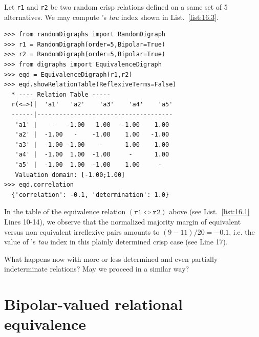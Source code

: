 Let \texttt{r1} and \texttt{r2} be two random crisp relations defined on a same set of 5 alternatives. We may compute \Kendall 's \emph{tau} index shown in List.~\vref{list:16.3}.
\begin{lstlisting}[caption={Computing a relational equivalence digraph},label=list:16.3]
>>> from randomDigraphs import RandomDigraph
>>> r1 = RandomDigraph(order=5,Bipolar=True)
>>> r2 = RandomDigraph(order=5,Bipolar=True)
>>> from digraphs import EquivalenceDigraph
>>> eqd = EquivalenceDigraph(r1,r2)
>>> eqd.showRelationTable(ReflexiveTerms=False)
  * ---- Relation Table -----
  r(<=>)|  'a1'	  'a2'	  'a3'	  'a4'	  'a5'	  
  ------|-------------------------------------
   'a1' |    -   -1.00   1.00   -1.00    1.00	 
   'a2' |  -1.00   -    -1.00    1.00   -1.00	 
   'a3' |  -1.00 -1.00    -      1.00    1.00	 
   'a4' |  -1.00  1.00  -1.00     -      1.00	 
   'a5' |  -1.00  1.00  -1.00    1.00     - 	 
   Valuation domain: [-1.00;1.00]
>>> eqd.correlation
  {'correlation': -0.1, 'determination': 1.0}
\end{lstlisting}
In the table of the equivalence relation $(\mathtt{r1} \Leftrightarrow \mathtt{r2})$ above (see List.~\vref{list:16.1} Lines 10-14), we observe that the normalized majority margin of equivalent versus non equivalent irreflexive pairs amounts to $(9 - 11)/20 = -0.1$, i.e. the value of \Kendall 's \emph{tau} index in this plainly determined crisp case (see Line 17).

What happens now with more or less determined and even partially indeterminate relations? May we proceed in a similar way?

\section{Bipolar-valued relational equivalence}
\label{sec:16.3}

